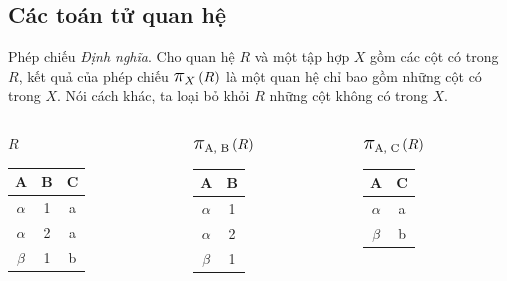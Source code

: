\documentclass[11pt, handout]{beamer}
\newcommand{\mmm}[1]{\mathlarger{\mathlarger{\mathlarger#1}}}%
\newcommand{\ppi}[2]{\mmm{\pi}_{#1}\left(#2\right)}%
\begin{document}
  \subsection{Các toán tử quan hệ}
  \begin{frame}{Phép chiếu}
    \textit{Định nghĩa}. Cho quan hệ $R$ và một tập hợp $X$ gồm các cột có trong $R$, 
    kết quả của phép chiếu $\ppi{X}{R}$ là một quan hệ chỉ bao gồm những cột có trong $X$.
    Nói cách khác, ta loại bỏ khỏi $R$ những cột không có trong $X$. 
  \end{frame}
  \begin{frame}
    \begin{columns}[T]
      \begin{column}{0.4\textwidth}
        \centering $R$
        \bigskip \\
        \begin{tabular}{|c|c|c|}
          \hline
          \textbf{A} & \textbf{B} & \textbf{C}  \\[0.5ex] \hline\hline
          $\alpha$ & 1 & a\\ \hline
          $\alpha$ & 2 & a\\ \hline
          $\beta$ & 1 & b\\ \hline
        \end{tabular}
      \end{column}
      \begin{column}{0.25\textwidth}
        \centering $\ppi{\text{A, B}}{R}$
        \medskip \\
        \begin{tabular}{|c|c|}
          \hline
          \textbf{A} & \textbf{B} \\[0.5ex] \hline\hline
          $\alpha$ & 1\\ \hline
          $\alpha$ & 2\\ \hline
          $\beta$ & 1\\ \hline
        \end{tabular}
      \end{column}
      \begin{column}{0.25\textwidth}
        \centering $\ppi{\text{A, C}}{R}$
        \medskip \\
        \begin{tabular}{|c|c|}
          \hline
          \textbf{A} & \textbf{C} \\[0.5ex] \hline\hline
          $\alpha$ & a\\ \hline
          $\beta$ & b\\ \hline
        \end{tabular}
      \end{column}
    \end{columns}
  \end{frame}
\end{document}
